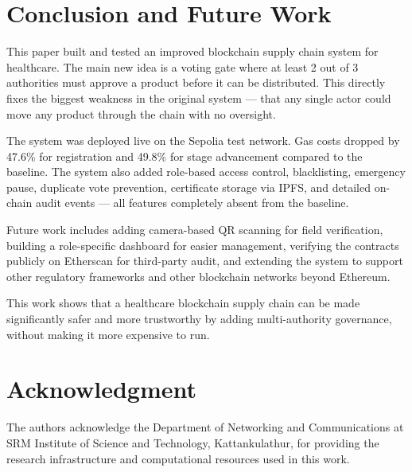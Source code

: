 \documentclass[conference]{IEEEtran}
\begin{document}
\section{Conclusion and Future Work}

This paper built and tested an improved blockchain supply chain system for healthcare. The main new idea is a voting gate where at least 2 out of 3 authorities must approve a product before it can be distributed. This directly fixes the biggest weakness in the original system --- that any single actor could move any product through the chain with no oversight.

The system was deployed live on the Sepolia test network. Gas costs dropped by 47.6\% for registration and 49.8\% for stage advancement compared to the baseline. The system also added role-based access control, blacklisting, emergency pause, duplicate vote prevention, certificate storage via IPFS, and detailed on-chain audit events --- all features completely absent from the baseline.

Future work includes adding camera-based QR scanning for field verification, building a role-specific dashboard for easier management, verifying the contracts publicly on Etherscan for third-party audit, and extending the system to support other regulatory frameworks and other blockchain networks beyond Ethereum.

This work shows that a healthcare blockchain supply chain can be made significantly safer and more trustworthy by adding multi-authority governance, without making it more expensive to run.

\section*{Acknowledgment}

The authors acknowledge the Department of Networking and Communications at SRM Institute of Science and Technology, Kattankulathur, for providing the research infrastructure and computational resources used in this work.
\end{document}
